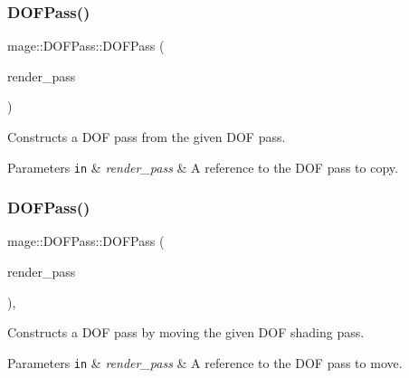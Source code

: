 \subsubsection{\texorpdfstring{D\+O\+F\+Pass()}{DOFPass()}\hspace{0.1cm}{\footnotesize\ttfamily [2/3]}}
{\footnotesize\ttfamily mage\+::\+D\+O\+F\+Pass\+::\+D\+O\+F\+Pass (\begin{DoxyParamCaption}\item[{const \hyperlink{classmage_1_1_d_o_f_pass}{D\+O\+F\+Pass} \&}]{render\+\_\+pass }\end{DoxyParamCaption})\hspace{0.3cm}{\ttfamily [delete]}}

Constructs a D\+OF pass from the given D\+OF pass.


\begin{DoxyParams}[1]{Parameters}
\mbox{\tt in}  & {\em render\+\_\+pass} & A reference to the D\+OF pass to copy. \\
\hline
\end{DoxyParams}
\hypertarget{classmage_1_1_d_o_f_pass_a800ce820beadcec67fd1477d57ccb9e2}{}\label{classmage_1_1_d_o_f_pass_a800ce820beadcec67fd1477d57ccb9e2} 
\subsubsection{\texorpdfstring{D\+O\+F\+Pass()}{DOFPass()}\hspace{0.1cm}{\footnotesize\ttfamily [3/3]}}
{\footnotesize\ttfamily mage\+::\+D\+O\+F\+Pass\+::\+D\+O\+F\+Pass (\begin{DoxyParamCaption}\item[{\hyperlink{classmage_1_1_d_o_f_pass}{D\+O\+F\+Pass} \&\&}]{render\+\_\+pass }\end{DoxyParamCaption})\hspace{0.3cm}{\ttfamily [default]}, {\ttfamily [noexcept]}}

Constructs a D\+OF pass by moving the given D\+OF shading pass.


\begin{DoxyParams}[1]{Parameters}
\mbox{\tt in}  & {\em render\+\_\+pass} & A reference to the D\+OF pass to move. \\
\hline
\end{DoxyParams}
\hypertarget{classmage_1_1_d_o_f_pass_a2a46bc7b2579f1d67fd412c89386d2f4}{}\label{classmage_1_1_d_o_f_pass_a2a46bc7b2579f1d67fd412c89386d2f4} 
